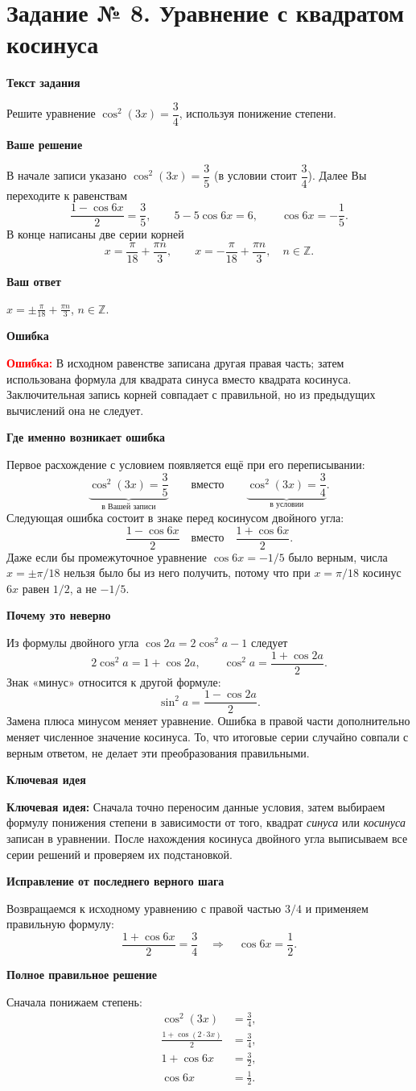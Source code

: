 \documentclass[12pt,a4paper]{article}
\newcommand{\heading}[1]{\par\vspace{4pt}\textbf{#1}\par}
\newcommand{\err}{\textcolor{red}{\textbf{Ошибка:}}}
\newcommand{\idea}{\textcolor{blue!60!black}{\textbf{Ключевая идея:}}}
\begin{document}
\section*{Задание № 8. Уравнение с квадратом косинуса}
\heading{Текст задания}
Решите уравнение $\cos^2(3x)=\dfrac34$, используя понижение степени.
\heading{Ваше решение}
В начале записи указано $\cos^2(3x)=\dfrac35$ (в условии стоит $\dfrac34$). Далее Вы переходите к равенствам
\[
\frac{1-\cos6x}{2}=\frac35,
\qquad 5-5\cos6x=6,
\qquad \cos6x=-\frac15.
\]
В конце написаны две серии корней
\[
x=\frac\pi{18}+\frac{\pi n}{3},\qquad
x=-\frac\pi{18}+\frac{\pi n}{3},\quad n\in\mathbb Z.
\]
\heading{Ваш ответ}
$\displaystyle x=\pm\frac\pi{18}+\frac{\pi n}{3}$, $n\in\mathbb Z$.
\heading{Ошибка}
\err{} В исходном равенстве записана другая правая часть; затем использована формула для квадрата синуса вместо квадрата косинуса. Заключительная запись корней совпадает с правильной, но из предыдущих вычислений она не следует.
\heading{Где именно возникает ошибка}
Первое расхождение с условием появляется ещё при его переписывании:
\[
\underbrace{\cos^2(3x)=\frac35}_{\text{в Вашей записи}}
\qquad\text{вместо}\qquad
\underbrace{\cos^2(3x)=\frac34}_{\text{в условии}}.
\]
Следующая ошибка состоит в знаке перед косинусом двойного угла:
\[
\frac{1-\cos6x}{2}\quad\text{вместо}\quad
\frac{1+\cos6x}{2}.
\]
Даже если бы промежуточное уравнение $\cos6x=-1/5$ было верным, числа $x=\pm\pi/18$ нельзя было бы из него получить, потому что при $x=\pi/18$ косинус $6x$ равен $1/2$, а не $-1/5$.
\heading{Почему это неверно}
Из формулы двойного угла $\cos2a=2\cos^2a-1$ следует
\[
2\cos^2a=1+\cos2a,
\qquad
\boxed{\cos^2a=\frac{1+\cos2a}{2}}.
\]
Знак «минус» относится к другой формуле:
\[
\sin^2a=\frac{1-\cos2a}{2}.
\]
Замена плюса минусом меняет уравнение. Ошибка в правой части дополнительно меняет численное значение косинуса. То, что итоговые серии случайно совпали с верным ответом, не делает эти преобразования правильными.
\heading{Ключевая идея}
\idea{} Сначала точно переносим данные условия, затем выбираем формулу понижения степени в зависимости от того, квадрат \emph{синуса} или \emph{косинуса} записан в уравнении. После нахождения косинуса двойного угла выписываем все серии решений и проверяем их подстановкой.
\heading{Исправление от последнего верного шага}
Возвращаемся к исходному уравнению с правой частью $3/4$ и применяем правильную формулу:
\[
\frac{1+\cos6x}{2}=\frac34
\quad\Longrightarrow\quad
\cos6x=\frac12.
\]
\heading{Полное правильное решение}
Сначала понижаем степень:
\begin{align*}
\cos^2(3x)&=\frac34,\\
\frac{1+\cos(2\cdot3x)}2&=\frac34,\\
1+\cos6x&=\frac32,\\
\cos6x&=\frac12.
\end{align*}
\end{document}
